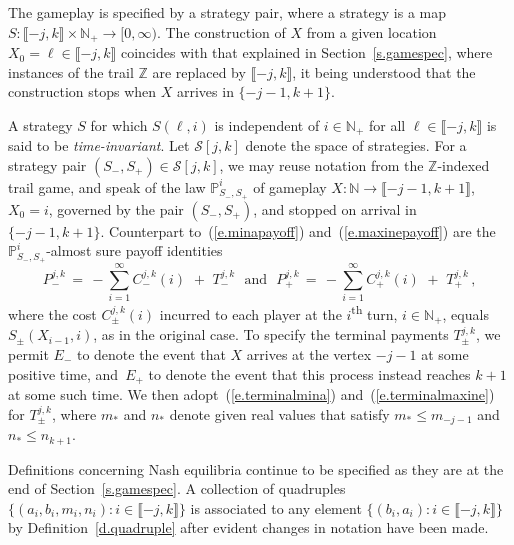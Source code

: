 \documentclass[letterpaper,11pt,oneside,reqno]{amsbook}
\newcommand{\PP}{\ensuremath{\mathbb{P}}}
\newcommand{\N}{\ensuremath{\mathbb{N}}}
\newcommand{\Z}{\ensuremath{\mathbb{Z}}}
\numberwithin{figure}{chapter}
\theoremstyle{definition}
\theoremstyle{definition}
\theoremstyle{definition}
\theoremstyle{definition}
\theoremstyle{definition}
\newcommand{\mc}{\mathcal}
\newcommand{\nwithoutzero}{\N_+}
\begin{document}
The gameplay is specified by a strategy pair, where 
a strategy is a map $S: \llbracket -  j,k \rrbracket \times \nwithoutzero   \to [0,\infty)$. 
The construction of $X$ from a given location $X_0 = \ell \in \llbracket -j,k \rrbracket$ coincides with that explained in Section~\ref{s.gamespec}, where instances of the trail $\Z$ are replaced by $\llbracket -j,k \rrbracket$, it being understood that the construction stops when $X$ arrives in $\{ - j-1,k+1 \}$.


A strategy $S$ for which $S(\ell,i)$ is independent of $i \in \nwithoutzero$ for all $\ell \in \llbracket -j,k \rrbracket$
is said to be {\em time-invariant}. 
Let $\mc{S}[j,k]$ denote the space of strategies.
For a strategy pair $(S_-,S_+) \in \mc{S}[j,k]$, 
we may reuse notation from the $\Z$-indexed trail game, 
and speak of the law $\PP_{S_-,S_+}^i$ of gameplay $X:\N \to \llbracket -j-1,k+1 \rrbracket$, $X_0 = i$, governed by the pair $(S_-,S_+)$, and stopped on arrival in $\{ -j-1,k+1 \}$. 
Counterpart to~(\ref{e.minapayoff}) and~(\ref{e.maxinepayoff}) are the  $\PP_{S_-,S_+}^i$-almost sure payoff identities
\begin{equation}\label{e.finitepayoff}
P^{j,k}_- \, = \,  - \sum_{i = 1}^\infty C^{j,k}_-(i) \, \, + \, \, T^{j,k}_-  \, \, \, \, \textrm{and} \, \, \, \,
P^{j,k}_+ \, = \,  - \sum_{i = 1}^\infty C^{j,k}_+(i) \, \, + \, \, T^{j,k}_+ \, ,
\end{equation}
where 
the cost  $C^{j,k}_\pm(i)$  incurred to each player at the $i$\textsuperscript{th} turn, $i \in \nwithoutzero$, equals $S_{\pm}(X_{i-1},i)$, as in the original case. 
To specify the terminal payments $T^{j,k}_\pm$, we permit $E_-$ to denote the event that $X$ arrives at the vertex $-j-1$ at some positive time, and~$E_+$ to denote the event that this process instead reaches $k+1$
at some such time. We then adopt~(\ref{e.terminalmina}) and~(\ref{e.terminalmaxine}) for $T_\pm^{j,k}$, where $m_*$ and $n_*$ denote given real values that satisfy $m_* \leq m_{-j-1}$
and $n_* \leq n_{k+1}$.





Definitions concerning Nash equilibria continue to be specified as they are at the end of Section~\ref{s.gamespec}. %
A collection of quadruples $\big\{ (a_i,b_i,m_i,n_i):i \in \llbracket -j,k \rrbracket \big\}$ is associated to any element $\big\{ (b_i,a_i): i \in \llbracket -j,k \rrbracket \big\}$
by Definition~\ref{d.quadruple} after evident changes in notation have been made.
\end{document}
